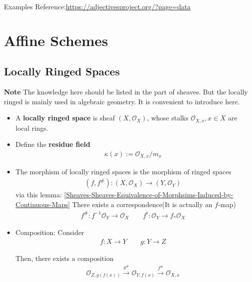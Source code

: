\documentclass[Total.tex]{subfiles}
\begin{document}
	Examples Reference:\url{https://adjectivesproject.org/?page=data}
	\chapter{Affine Schemes}
		\section{Locally Ringed Spaces}
		
			\textbf{Note} The knowledge here should be listed in the part of sheaves. But the locally ringed is mainly used in algebraic geometry. It is convenient to introduce here. 
			
			\begin{Def}
				\begin{itemize}
					\item A \textbf{locally ringed space} is sheaf $(X,\mathcal{O}_X)$, whose stalks $\mathcal{O}_{X,x},x\in X$ are local rings.
					\item Define the \textbf{residue field}
					\begin{gather*}
						\kappa(x):=\mathcal{O}_{X,x}/m_x
					\end{gather*}
					\item The morphism of locally ringed spaces is the morphism of ringed spaces
					\begin{gather*}
						(f,f^\#):(X,\mathcal{O}_X)\rightarrow (Y,\mathcal{O}_Y)
					\end{gather*} 
					via this lemma: \ref{Sheaves-Sheaves-Equivalence-of-Morphsims-Induced-by-Continuous-Maps} There exists a correspondence(It is actually an $f$-map)
					\begin{gather*}
						f^\#:f^{-1}\mathcal{O}_Y\rightarrow \mathcal{O}_X\qquad f^\flat:\mathcal{O}_Y\rightarrow f_*\mathcal{O}_X
					\end{gather*}
					\item Composition: Consider 
					\begin{gather*}
						f:X\rightarrow Y\qquad g:Y\rightarrow Z
					\end{gather*}
					
					Then, there exists a composition
					\begin{gather*}
						\mathcal{O}_{Z,g(f(x))}\stackrel{g^\#}{\rightarrow} \mathcal{O}_{Y,f(x)}\stackrel{f^\#}{\rightarrow} \mathcal{O}_{X,x}
					\end{gather*}
				\end{itemize}
			\end{Def}
			
\end{document}
